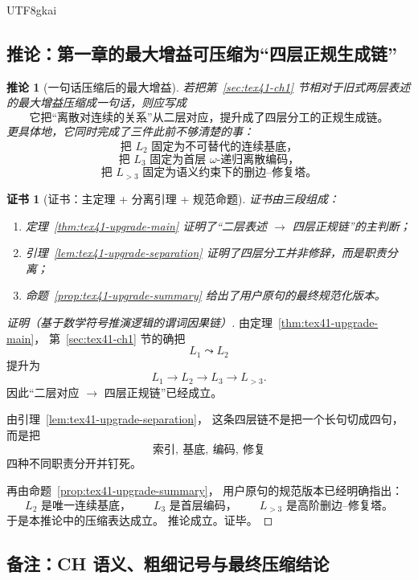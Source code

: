 \documentclass[12pt]{article}
\newtheorem{corollary}{推论}[section]
\newtheorem{Certificate}{证书}[section]
\begin{document}
\begin{CJK*}{UTF8}{gkai}
\subsection{推论：第一章的最大增益可压缩为“四层正规生成链”}
\label{subsec:tex41-upgrade-corollary}

\begin{corollary}[一句话压缩后的最大增益]
\label{cor:tex41-upgrade-main}
若把第~\ref{sec:tex41-ch1} 节相对于旧式两层表述的最大增益压缩成一句话，则应写成
\[
\boxed{
  \text{它把“离散对连续的关系”从二层对应，提升成了四层分工的正规生成链。}
}
\]
更具体地，它同时完成了三件此前不够清楚的事：
\[
  \text{把 }L_2\text{ 固定为不可替代的连续基底，}
\]
\[
  \text{把 }L_3\text{ 固定为首层 }\omega\text{-递归离散编码，}
\]
\[
  \text{把 }L_{>3}\text{ 固定为语义约束下的删边--修复塔。}
\]
\end{corollary}

\begin{Certificate}[证书：主定理 + 分离引理 + 规范命题]
\label{cert:tex41-upgrade-main-cor}
证书由三段组成：
\begin{enumerate}
  \item 定理~\ref{thm:tex41-upgrade-main} 证明了“二层表述 $\to$ 四层正规链”的主判断；
  \item 引理~\ref{lem:tex41-upgrade-separation} 证明了四层分工并非修辞，而是职责分离；
  \item 命题~\ref{prop:tex41-upgrade-summary} 给出了用户原句的最终规范化版本。
\end{enumerate}
\end{Certificate}

\begin{proof}[证明（基于数学符号推演逻辑的谓词因果链）]
由定理~\ref{thm:tex41-upgrade-main}，
第~\ref{sec:tex41-ch1} 节的确把
\[
  L_1\leadsto L_2
\]
提升为
\[
  L_1\to L_2\to L_3\to L_{>3}.
\]
因此“二层对应 $\to$ 四层正规链”已经成立。

由引理~\ref{lem:tex41-upgrade-separation}，
这条四层链不是把一个长句切成四句，
而是把
\[
  \text{索引},\ \text{基底},\ \text{编码},\ \text{修复}
\]
四种不同职责分开并钉死。

再由命题~\ref{prop:tex41-upgrade-summary}，
用户原句的规范版本已经明确指出：
\[
  L_2\text{ 是唯一连续基底，}
  \qquad
  L_3\text{ 是首层编码，}
  \qquad
  L_{>3}\text{ 是高阶删边--修复塔。}
\]
于是本推论中的压缩表达成立。
推论成立。证毕。
\end{proof}

\subsection{备注：CH 语义、粗细记号与最终压缩结论}
\label{subsec:tex41-upgrade-remarks}


\end{CJK*}
\end{document}
